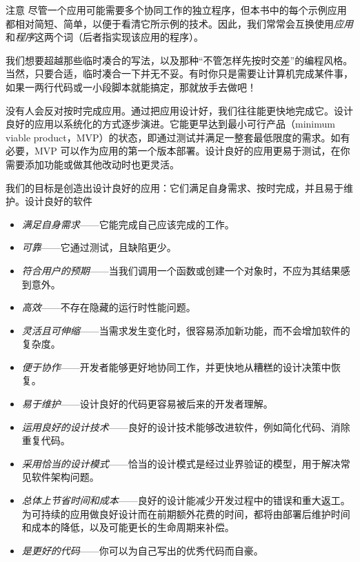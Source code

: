 \begin{myWarning}{注意}
尽管一个应用可能需要多个协同工作的独立程序，但本书中的每个示例应用都相对简短、简单，以便于看清它所示例的技术。因此，我们常常会互换使用\emph{应用}和\emph{程序}这两个词（后者指实现该应用的程序）。
\end{myWarning}

我们想要超越那些临时凑合的写法，以及那种“不管怎样先按时交差”的编程风格。当然，只要合适，临时凑合一下并无不妥。有时你只是需要让计算机完成某件事，如果一两行代码或一小段脚本就能搞定，那就放手去做吧！

没有人会反对按时完成应用。通过把应用设计好，我们往往能更快地完成它。设计良好的应用以系统化的方式逐步演进。它能更早达到最小可行产品（minimum viable product，MVP）的状态，即通过测试并满足一整套最低限度的需求。如有必要，MVP 可以作为应用的第一个版本部署。设计良好的应用更易于测试，在你需要添加功能或做其他改动时也更灵活。

我们的目标是创造出设计良好的应用：它们满足自身需求、按时完成，并且易于维护。设计良好的软件

\begin{itemize}
\item \emph{满足自身需求}——它能完成自己应该完成的工作。
\item \emph{可靠}——它通过测试，且缺陷更少。
\item \emph{符合用户的预期}——当我们调用一个函数或创建一个对象时，不应为其结果感到意外。
\item \emph{高效}——不存在隐藏的运行时性能问题。
\item \emph{灵活且可伸缩}——当需求发生变化时，很容易添加新功能，而不会增加软件的复杂度。
\item \emph{便于协作}——开发者能够更好地协同工作，并更快地从糟糕的设计决策中恢复。
\item \emph{易于维护}——设计良好的代码更容易被后来的开发者理解。
\item \emph{运用良好的设计技术}——良好的设计技术能够改进软件，例如简化代码、消除重复代码。
\item \emph{采用恰当的设计模式}——恰当的设计模式是经过业界验证的模型，用于解决常见软件架构问题。
\item \emph{总体上节省时间和成本}——良好的设计能减少开发过程中的错误和重大返工。为可持续的应用做良好设计而在前期额外花费的时间，都将由部署后维护时间和成本的降低，以及可能更长的生命周期来补偿。
\item \emph{是更好的代码}——你可以为自己写出的优秀代码而自豪。
\end{itemize}


